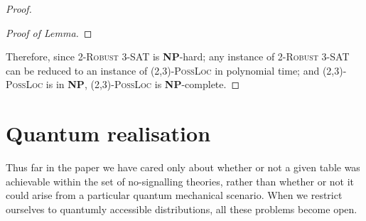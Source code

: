 \documentclass[reprint]{revtex4-1}
\theoremstyle{definition}
\begin{document}
\begin{proof}
\begin{proof}[Proof of Lemma]
\end{proof}

Therefore, since \textsc{2-Robust 3-SAT} is \textbf{NP}-hard; any instance of \textsc{2-Robust 3-SAT} can be reduced to an instance of \textsc{(2,3)-PossLoc} in polynomial time; and \textsc{(2,3)-PossLoc} is in \textbf{NP}, \textsc{(2,3)-PossLoc} is \textbf{NP}-complete.
\end{proof}

\section{Quantum realisation}\label{QR}
Thus far in the paper we have cared only about whether or not a given table was achievable within the set of no-signalling theories, rather than whether or not it could arise from a particular quantum mechanical scenario. When we restrict ourselves to quantumly accessible distributions, all these problems become open.
\end{document}
